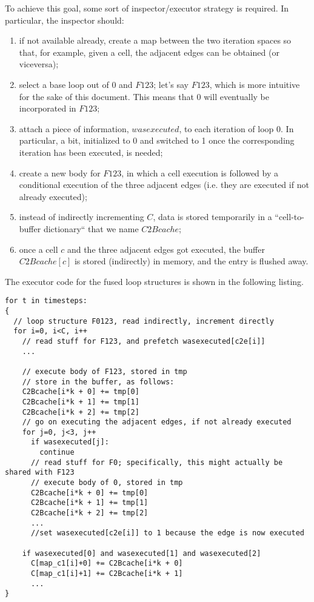 \documentclass[a4paper]{article}
\begin{document}
To achieve this goal, some sort of inspector/executor strategy is required. In particular, the inspector should:
\begin{enumerate}
\item if not available already, create a map between the two iteration spaces so that, for example, given a cell, the adjacent edges can be obtained (or viceversa);
\item select a base loop out of $0$ and $F123$; let's say $F123$, which is more intuitive for the sake of this document. This means that $0$ will eventually be incorporated in $F123$;
\item attach a piece of information, $wasexecuted$, to each iteration of loop $0$. In particular, a bit, initialized to 0 and switched to 1 once the corresponding iteration has been executed, is needed;
\item create a new body for $F123$, in which a cell execution is followed by a conditional execution of the three adjacent edges (i.e. they are executed if not already executed);
\item instead of indirectly incrementing $C$, data is stored temporarily in a ``cell-to-buffer dictionary`` that we name $C2Bcache$;
\item once a cell $c$ and the three adjacent edges got executed, the buffer $C2Bcache[c]$ is stored (indirectly) in memory, and the entry is flushed away.
\end{enumerate}

The executor code for the fused loop structures is shown in the following listing.

\clearpage

\begin{footnotesize}
\begin{lstlisting}
for t in timesteps:
{ 
  // loop structure F0123, read indirectly, increment directly
  for i=0, i<C, i++
    // read stuff for F123, and prefetch wasexecuted[c2e[i]]
    ...

	// execute body of F123, stored in tmp
	// store in the buffer, as follows:
    C2Bcache[i*k + 0] += tmp[0]
    C2Bcache[i*k + 1] += tmp[1]
    C2Bcache[i*k + 2] += tmp[2]
    // go on executing the adjacent edges, if not already executed
    for j=0, j<3, j++
      if wasexecuted[j]:
        continue
      // read stuff for F0; specifically, this might actually be shared with F123
      // execute body of 0, stored in tmp
      C2Bcache[i*k + 0] += tmp[0]
      C2Bcache[i*k + 1] += tmp[1]
      C2Bcache[i*k + 2] += tmp[2]
      ...
      //set wasexecuted[c2e[i]] to 1 because the edge is now executed
      
    if wasexecuted[0] and wasexecuted[1] and wasexecuted[2]
      C[map_c1[i]+0] += C2Bcache[i*k + 0]
      C[map_c1[i]+1] += C2Bcache[i*k + 1]
      ...
}
\end{lstlisting}
\end{footnotesize}
\end{document}
